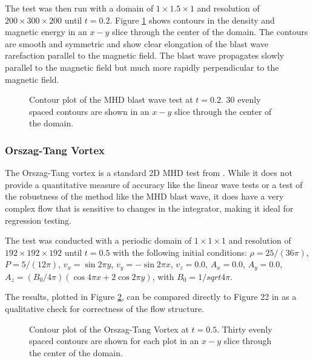 The test was then run with a domain of $1\times1.5\times1$ and resolution of $200\times300\times200$ until $t = 0.2$. Figure \ref{fig:blast} shows contours in the density and magnetic energy in an $x-y$ slice through the center of the domain. The contours are smooth and symmetric and show clear elongation of the blast wave rarefaction parallel to the magnetic field. The blast wave propagates slowly parallel to the magnetic field but much more rapidly perpendicular to the magnetic field.

\begin{figure}[ht!]
    \caption{Contour plot of the MHD blast wave test at $t=0.2$. 30 evenly spaced contours are shown in an $x-y$ slice through the center of the domain. }
    \label{fig:blast}
\end{figure}

\subsubsection{Orszag-Tang Vortex}
\label{sec:otv}

The Orszag-Tang vortex is a standard 2D MHD test from \cite{otv_1979}. While it does not provide a quantitative measure of accuracy like the linear wave tests or a test of the robustness of the method like the MHD blast wave, it does have a very complex flow that is sensitive to changes in the integrator, making it ideal for regression testing.

The test was conducted with a periodic domain of $1\times1\times1$ and resolution of $192\times192\times192$ until $t = 0.5$ with the following initial conditions: 
$\rho = 25 / \left( 36 \pi \right)$,
$P    =  5 / \left( 12 \pi \right)$,
$v_x  = \sin 2\pi y$,
$v_y  = -\sin 2\pi x$,
$v_z  = 0.0$,
$A_x  = 0.0$,
$A_y  = 0.0$,
$A_z  = \left( B_0/4\pi \right) \left( \cos{4\pi x} + 2 \cos{2\pi y} \right)$, with $B_0 = 1/sqrt{4\pi}$.

The results, plotted in Figure \ref{fig:otv}, can be compared directly to Figure 22 in \cite{stone_athena_2008} as a qualitative check for correctness of the flow structure.

\begin{figure}[!ht]
    \caption{Contour plot of the Orszag-Tang Vortex at $t=0.5$. Thirty evenly spaced contours are shown for each plot in an $x-y$ slice through the center of the domain.  }
    \label{fig:otv}
\end{figure}

